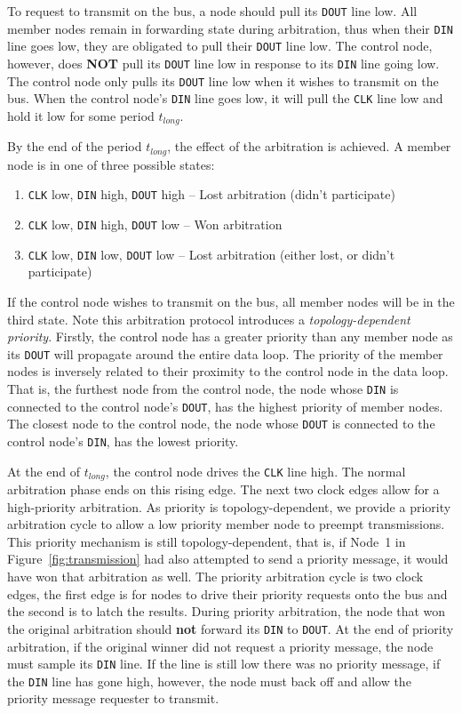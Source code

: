To request to transmit on the bus, a node should pull its {\tt DOUT} line low.
All member nodes remain in forwarding state during arbitration, thus when
their {\tt DIN} line goes low, they are obligated to pull their {\tt DOUT}
line low. The control node, however, does {\bf NOT} pull its {\tt DOUT} line
low in response to its {\tt DIN} line going low. The control node only pulls
its {\tt DOUT} line low when it wishes to transmit on the bus. When the
control node's {\tt DIN} line goes low, it will pull the {\tt CLK} line low
and hold it low for some period $t_{long}$.

By the end of the period $t_{long}$, the effect of the arbitration is
achieved. A member node is in one of three possible states:
\begin{enumerate}
  \item {\tt CLK} low, {\tt DIN} high, {\tt DOUT} high -- Lost arbitration
    (didn't participate)
  \item {\tt CLK} low, {\tt DIN} high, {\tt DOUT} low -- Won arbitration
  \item {\tt CLK} low, {\tt DIN} low, {\tt DOUT} low -- Lost arbitration
    (either lost, or didn't participate)
\end{enumerate}
If the control node wishes to transmit on the bus, all member nodes will be in
the third state. Note this arbitration protocol introduces a {\em
topology-dependent priority}. Firstly, the control node has a greater priority
than any member node as its {\tt DOUT} will propagate around the entire data
loop. The priority of the member nodes is inversely related to their proximity
to the control node in the data loop. That is, the furthest node from the
control node, the node whose {\tt DIN} is connected to the control node's
{\tt DOUT}, has the highest priority of member nodes. The closest node to the
control node, the node whose {\tt DOUT} is connected to the control node's
{\tt DIN}, has the lowest priority.

At the end of $t_{long}$, the control node drives the {\tt CLK} line high. The
normal arbitration phase ends on this rising edge. The next two clock edges
allow for a high-priority arbitration. As \bus priority is topology-dependent,
we provide a priority arbitration cycle to allow a low priority member node to
preempt transmissions. This priority mechanism is still topology-dependent,
that is, if Node~1 in Figure~\ref{fig:transmission} had also attempted to send
a priority message, it would have won that arbitration as well. The priority
arbitration cycle is two clock edges, the first edge is for nodes to drive
their priority requests onto the bus and the second is to latch the results.
During priority arbitration, the node that won the original arbitration should
{\bf not} forward its {\tt DIN} to {\tt DOUT}. At the end of priority
arbitration, if the original winner did not request a priority message, the
node must sample its {\tt DIN} line. If the line is still low there was no
priority message, if the {\tt DIN} line has gone high, however, the node
must back off and allow the priority message requester to transmit.

